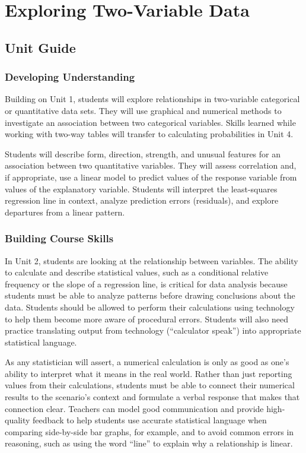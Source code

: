 \section{Exploring Two-Variable Data}

\subsection{Unit Guide}

\subsubsection{Developing Understanding}

Building on Unit 1, students will explore relationships in two-variable categorical or quantitative data sets. They will use graphical and numerical methods to investigate an association between two categorical variables. Skills learned while working with two-way tables will transfer to calculating probabilities in Unit 4.

Students will describe form, direction, strength, and unusual features for an association between two quantitative variables. They will assess correlation and, if appropriate, use a linear model to predict values of the response variable from values of the explanatory variable. Students will interpret the least-squares regression line in context, analyze prediction errors (residuals), and explore departures from a linear pattern.

\subsubsection{Building Course Skills}

In Unit 2, students are looking at the relationship between variables. The ability to calculate and describe statistical values, such as a conditional relative frequency or the slope of a regression line, is critical for data analysis because students must be able to analyze patterns before drawing conclusions about the data. Students should be allowed to perform their calculations using technology to help them become more aware of procedural errors. Students will also need practice translating output from technology (``calculator speak'') into appropriate statistical language.

As any statistician will assert, a numerical calculation is only as good as one's ability to interpret what it means in the real world. Rather than just reporting values from their calculations, students must be able to connect their numerical results to the scenario's context and formulate a verbal response that makes that connection clear. Teachers can model good communication and provide high-quality feedback to help students use accurate statistical language when comparing side-by-side bar graphs, for example, and to avoid common errors in reasoning, such as using the word ``line'' to explain why a relationship is linear.

